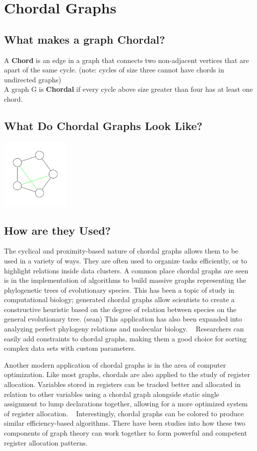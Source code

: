 \chapter{Chordal Graphs}
\section{What makes a graph Chordal?}
A \textbf{Chord} is an edge in a graph that connects two non-adjacent vertices that are apart of the same cycle. (note: cycles of size three cannot have chords in undirected graphs)\\
A graph G is \textbf{Chordal} if every cycle above size greater than four has at least one chord.\\

\section{What Do Chordal Graphs Look Like?}
\includegraphics[width=0.25\textwidth]{./ChapterChordal/chordalGraph.pdf}

\section{How are they Used?}
The cyclical and proximity-based nature of chordal graphs allows them to be used in a variety of ways. They are often used to organize
tasks efficiently, or to highlight relations inside data clusters. A common place chordal graphs are seen is in the implementation of algorithms to build
massive graphs representing the phylogenetic trees of evolutionary species. This has been a topic of study in computational biology; generated chordal
graphs allow scientists to create a constructive heuristic based on the degree of relation between species on the general evolutionary tree. (sean) This
application has also been expanded into analyzing perfect phylogeny relations and molecular biology. ~\cite{kennedy_2005}  Researchers can easily add constraints to
chordal graphs, making them a good choice for sorting complex data sets with custom parameters.\par
Another modern application of chordal graphs is in the area of computer optimization. Like most graphs, chordals are also applied to the study of
register allocation. Variables stored in registers can be tracked better and allocated in relation to other variables using a chordal graph alongside
static single assignment to lump declarations together, allowing for a more optimized system of register allocation. ~\cite{hack_2007} Interestingly, chordal graphs
can be colored to produce similar efficiency-based algorithms. There have been studies into how these two components of graph theory can work together to
form powerful and competent register allocation patterns. ~\cite{pereira_palsberg}\\

